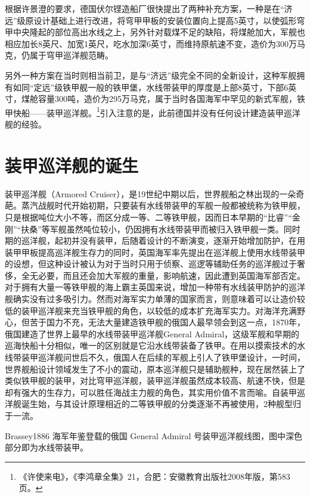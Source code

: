 \documentclass[12pt,UTF8]{ctexbook}
\begin{document}
根据许景澄的要求，德国伏尔铿造船厂很快提出了两种补充方案，一种是在“济远”级原设计基础上进行改进，将穹甲甲板的安装位置向上提高5英寸，以使弧形穹甲中央隆起的部位高出水线之上，另外针对载煤不足的缺陷，将煤舱加大，军舰也相应加长8英尺、加宽1英尺，吃水加深6英寸，而维持原航速不变，造价为300万马克，仍属于穹甲巡洋舰范畴。

另外一种方案在当时则相当前卫，是与“济远”级完全不同的全新设计，这种军舰拥有如同“定远”级铁甲舰一般的铁甲堡，水线带装甲的厚度是上部8英寸，下部6英寸，煤舱容量300吨，造价为295万马克，属于当时各国海军中罕见的新式军舰，铁甲快船——装甲巡洋舰。\footnote{《许使来电》，《李鸿章全集》21，合肥：安徽教育出版社2008年版，第583页。}引入注意的是，此前德国并没有任何设计建造装甲巡洋舰的经验。

\section{装甲巡洋舰的诞生}

装甲巡洋舰（Armored Cruiser），是19世纪中期以后，世界舰船之林出现的一朵奇葩。蒸汽战舰时代开始初期，只要装有水线带装甲的军舰一般都被统称为铁甲舰，只是根据吨位大小不等，而区分成一等、二等铁甲舰，因而日本早期的“比睿”“金刚”“扶桑”等军舰虽然吨位较小，仍因拥有水线带装甲而被归入铁甲舰一类。同时期的巡洋舰，起初并没有装甲，后随着设计的不断演变，逐渐开始增加防护，在用装甲甲板提高巡洋舰生存力的同时，英国海军率先提出在巡洋舰上使用水线带装甲的设想，但这种设计被认为对于当时只用于侦察、巡逻等辅助任务的巡洋舰过于奢侈，全无必要，而且还会加大军舰的重量，影响航速，因此遭到英国海军部否定。对于拥有大量一等铁甲舰的海上霸主英国来说，增加一种带有水线装甲防护的巡洋舰确实没有过多吸引力。然而对海军实力单薄的国家而言，则意味着可以让造价较低的装甲巡洋舰来充当铁甲舰的角色，以较低的成本扩充海军实力。对海洋充满野心，但苦于国力不充，无法大量建造铁甲舰的俄国人最早领会到这一点，1870年，俄国建造了世界上最早的水线带装甲巡洋舰General Admiral，这级军舰和早期的巡海快船十分相似，唯一的区别就是它沿水线带装备了铁甲。在用以摸索技术的水线带装甲巡洋舰问世后不久，俄国人在后续的军舰上引人了铁甲堡设计，一时间，世界舰船设计领域发生了不小的震动，原本巡洋舰只是辅助舰种，现在居然装上了类似铁甲舰的装甲，对比穹甲巡洋舰，装甲巡洋舰虽然成本较高、航速不快，但是却有强大的生存力，可以胜任海战主力舰的角色，其实用价值不言而喻。自装甲巡洋舰诞生始，与其设计原理相近的二等铁甲舰的分类逐渐不再被使用，2种舰型归于一流。

Brassey1886 海军年鉴登载的俄国 General Admiral 号装甲巡洋舰线图，图中深色部分即为水线带装甲。
\end{document}
